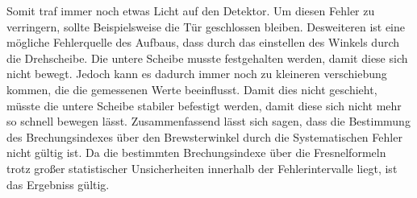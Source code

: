 Somit traf immer noch etwas Licht auf den Detektor. 
Um diesen Fehler zu verringern, sollte Beispielsweise die Tür geschlossen bleiben.
Desweiteren ist eine mögliche Fehlerquelle des Aufbaus, dass durch das einstellen des Winkels durch die Drehscheibe.
Die untere Scheibe musste festgehalten werden, damit diese sich nicht bewegt.
Jedoch kann es dadurch immer noch zu kleineren verschiebung kommen, die die gemessenen Werte beeinflusst.
Damit dies nicht geschieht, müsste die untere Scheibe stabiler befestigt werden, damit diese sich nicht mehr so schnell bewegen lässt.
Zusammenfassend lässt sich sagen, dass die Bestimmung des Brechungsindexes über den Brewsterwinkel durch die Systematischen Fehler nicht gültig ist.
Da die bestimmten Brechungsindexe über die Fresnelformeln trotz großer statistischer Unsicherheiten innerhalb der Fehlerintervalle liegt, ist das Ergebniss gültig.    